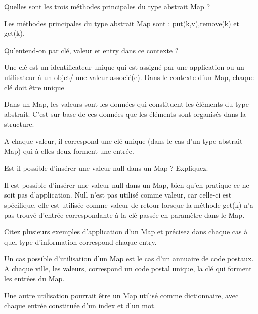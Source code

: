 Quelles sont les trois méthodes principales du type abstrait Map ?

Les méthodes principales du type abstrait Map sont : put(k,v),remove(k) et get(k).

Qu’entend-on par clé, valeur et entry dans ce contexte ?

Une clé est un identificateur unique qui est assigné par une application ou un utilisateur à un objet/ une valeur associé(e). Dans le contexte d'un Map, chaque clé doit être unique

Dans un Map, les valeurs sont les données qui constituent les éléments du type abstrait. C'est sur base de ces données que les éléments sont organisés dans la structure.

A chaque valeur, il correspond une clé unique (dans le cas d'un type abstrait Map) qui à elles deux forment une entrée.

Est-il possible d’insérer une valeur null dans un Map ? Expliquez.

Il est possible d'insérer une valeur null dans un Map, bien qu'en pratique ce ne soit pas d'application. Null n'est pas utilisé comme valeur, car celle-ci est spécifique, elle est utilisée comme valeur de retour lorsque la méthode get(k) n'a pas trouvé d'entrée correspondante à la clé passée en paramètre dans le Map.

Citez plusieurs exemples d’application d’un Map et précisez dans chaque cas à quel type d’information correspond chaque entry.

Un cas possible d'utilisation d'un Map est le cas d'un annuaire de code postaux. A chaque ville, les valeurs, correspond un code postal unique, la clé qui forment les entrées du Map.

Une autre utilisation pourrait être un Map utilisé comme dictionnaire, avec chaque entrée constituée d'un index et d'un mot.
